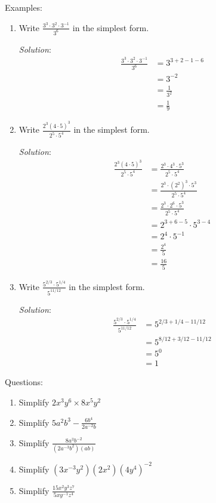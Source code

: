 \documentclass[16pt]{article}
\theoremstyle{remark}
\begin{document}
Examples:
\begin{enumerate}
\item  Write $\displaystyle{\frac{3^3 \cdot 3^2 \cdot 3^{-1}}{3^6}}$ in the simplest form.
\begin{mdframed}[style=TheoremFrame]
\textit{Solution}:
\begin{align*}
\frac{3^3 \cdot 3^2 \cdot 3^{-1}}{3^6} &= 3^{3+2-1-6}\\
&= 3^{-2}\\
&= \frac{1}{3^2}\\
&= \frac{1}{9}
\end{align*}
\end{mdframed}
\newpage
\item Write $\displaystyle{\frac{2^3 (4\cdot 5)^3}{2^5 \cdot5^4}}$ in the simplest form.
\begin{mdframed}[style=TheoremFrame]
\textit{Solution}:
\begin{align*}
\frac{2^3 (4\cdot 5)^3}{2^5 \cdot 5^4} &= \frac{2^3 \cdot 4^3 \cdot 5^3}{2^5 \cdot 5^4}\\
&= \frac{2^3 \cdot (2^2)^3 \cdot 5^3}{2^5 \cdot 5^4}\\
&= \frac{2^3 \cdot 2^6 \cdot 5^3}{2^5 \cdot 5^4}\\
&= 2^{3+6-5} \cdot 5^{3-4}\\
&= 2^4 \cdot 5^{-1}\\
&= \frac{2^4}{5}\\
&= \frac{16}{5}
\end{align*}
\end{mdframed}
\item Write $\displaystyle{\frac{5^{2/3} \cdot 5^{1/4}}{5^{11/12}}}$ in the simplest form.
\begin{mdframed}[style=TheoremFrame]
\textit{Solution}:
\begin{align*}
\frac{5^{2/3} \cdot 5^{1/4}}{5^{11/12}} &= 5^{2/3 + 1/4 - 11/12}\\
&= 5^{8/12 + 3/12 - 11/12}\\
&= 5^0\\
&=1
\end{align*}
\end{mdframed}
\end{enumerate}
Questions:
\begin{enumerate}
\item Simplify $\displaystyle{2x^3 y^6 \times 8x^5 y^2}$
\newpage
\item Simplify $\displaystyle{5a^2b^3-\frac{6b^4}{2a^{-2}b}}$
\vspace{5cm}
\item Simplify $\displaystyle{\frac{8a^3b^{-2}}{(2a^{-3}b^2)(ab)}}$
\vspace{5cm}
\item Simplify $\displaystyle{(3x^{-3}y^2)(2x^2)(4y^4)^{-2}}$
\vspace{5cm}
\item Simplify $\displaystyle{\frac{15x^2y^3z^7}{5xy^{-1}z^4}}$
\vspace{5cm}
\end{enumerate}
\end{document}
